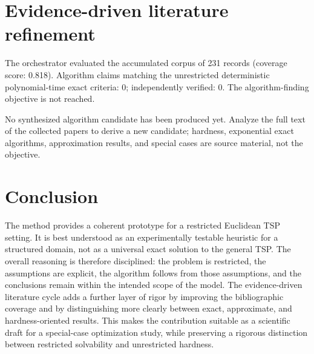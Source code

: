 \documentclass[11pt]{article}
\begin{document}
\section{Evidence-driven literature refinement}

The orchestrator evaluated the accumulated corpus of 231 records (coverage score: 0.818). Algorithm claims matching the unrestricted deterministic polynomial-time exact criteria: 0; independently verified: 0. The algorithm-finding objective is not reached.

No synthesized algorithm candidate has been produced yet. Analyze the full text of the collected papers to derive a new candidate; hardness, exponential exact algorithms, approximation results, and special cases are source material, not the objective.
\section{Conclusion}

The method provides a coherent prototype for a restricted Euclidean TSP setting. It is best understood as an experimentally testable heuristic for a structured domain, not as a universal exact solution to the general TSP. The overall reasoning is therefore disciplined: the problem is restricted, the assumptions are explicit, the algorithm follows from those assumptions, and the conclusions remain within the intended scope of the model. The evidence-driven literature cycle adds a further layer of rigor by improving the bibliographic coverage and by distinguishing more clearly between exact, approximate, and hardness-oriented results. This makes the contribution suitable as a scientific draft for a special-case optimization study, while preserving a rigorous distinction between restricted solvability and unrestricted hardness.
\end{document}
